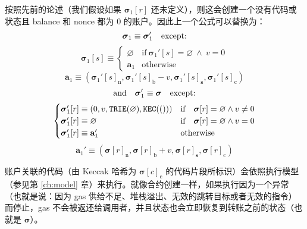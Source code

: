 \documentclass[9pt,oneside]{amsart}
\begin{document}
\begin{multicols}{2}
按照先前的论述（我们假设如果 $\boldsymbol{\sigma}_1[r]$ 还未定义），则这会创建一个没有代码或状态且 balance 和 nonce 都为 0 的账户。因此上一个公式可以替换为：
\begin{equation}
\boldsymbol{\sigma}_1 \equiv \boldsymbol{\sigma}_1' \quad \text{except:} \\
\end{equation}
\begin{equation}
\boldsymbol{\sigma}_1[s] \equiv \begin{cases}
\varnothing & \text{if}\ \boldsymbol{\sigma}_1'[s] = \varnothing \ \wedge\ v = 0 \\
\mathbf{a}_1 &\text{otherwise}
\end{cases}
\end{equation}
\begin{equation}
\mathbf{a}_1 \equiv \left(\boldsymbol{\sigma}_1'[s]_{\mathrm{n}}, \boldsymbol{\sigma}_1'[s]_{\mathrm{b}} - v, \boldsymbol{\sigma}_1'[s]_{\mathbf{s}}, \boldsymbol{\sigma}_1'[s]_{\mathrm{c}}\right)
\end{equation}
\begin{equation}
\text{and}\quad \boldsymbol{\sigma}_1' \equiv \boldsymbol{\sigma} \quad \text{except:} \\
\end{equation}
\begin{equation}
\begin{cases}
\boldsymbol{\sigma}_1'[r] \equiv (0, v, \mathtt{\tiny TRIE}(\varnothing), \mathtt{\tiny KEC}(())) & \text{if} \quad \boldsymbol{\sigma}[r] = \varnothing \wedge v \neq 0 \\
\boldsymbol{\sigma}_1'[r] \equiv \varnothing & \text{if}\quad \boldsymbol{\sigma}[r] = \varnothing \wedge v = 0 \\
\boldsymbol{\sigma}_1'[r] \equiv \mathbf{a}_1' & \text{otherwise}
\end{cases}
\end{equation}
\begin{equation}
\mathbf{a}_1' \equiv (\boldsymbol{\sigma}[r]_{\mathrm{n}}, \boldsymbol{\sigma}[r]_{\mathrm{b}} + v, \boldsymbol{\sigma}[r]_{\mathbf{s}}, \boldsymbol{\sigma}[r]_{\mathrm{c}})
\end{equation}

账户关联的代码（由 Keccak 哈希为 $\boldsymbol{\sigma}[c]_{\mathrm{c}}$ 的代码片段所标识）会依照执行模型（参见第 \ref{ch:model} 章）来执行。就像合约创建一样，如果执行因为一个异常（也就是说：因为 gas 供给不足、堆栈溢出、无效的跳转目标或者无效的指令）而停止，gas 不会被返还给调用者，并且状态也会立即恢复到转账之前的状态（也就是 $\boldsymbol{\sigma}$）。


\end{multicols}
\end{document}
